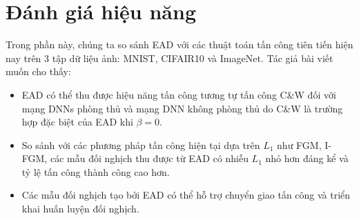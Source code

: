\section{Đánh giá hiệu năng}
Trong phần này, chúng ta so sánh EAD với các thuật toán tấn công tiên tiến hiện nay trên 3 
tập dữ liệu ảnh: MNIST, CIFAIR10 và ImageNet. Tác giả bài viết muốn cho thấy:
\begin{itemize}
    \item EAD có thể thu được hiệu năng tấn công tương tự tấn công C\&W đối với mạng DNNs 
    phòng thủ và mạng DNN không phòng thủ do C\&W là trường hợp đặc biệt của EAD khi 
    $\beta = 0$.
    \item So sánh với các phương pháp tấn công hiện tại dựa trên $L_1$ như FGM, I-FGM, 
    các mẫu đối nghịch thu được từ EAD có nhiễu $L_1$ nhỏ hơn đáng kể và tỷ lệ tấn công 
    thành công cao hơn.
    \item Các mẫu đối nghịch tạo bởi EAD có thể hỗ trợ chuyển giao tấn công và triển khai 
    huấn luyện đối nghịch.
\end{itemize}